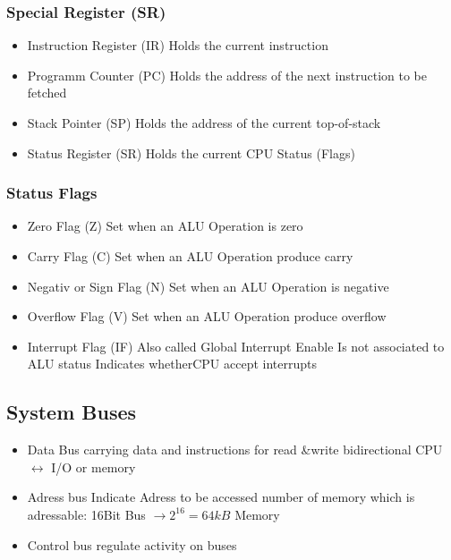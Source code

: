 \begin{multicols}{2}
	\subsubsection{Special Register (\acs{SR})}	
	\begin{itemize}
		\item Instruction Register (\acs{IR})
		\subitem Holds the current instruction 
		\item Programm Counter (\acs{PC})
		\subitem Holds the address of the next instruction to be fetched
		\item Stack Pointer (\acs{SP})
		\subitem Holds the address of the current top-of-stack 
		\item Status Register (\acs{SR})
		\subitem Holds the current \acs{CPU} Status (Flags)
	\end{itemize}
	\subsubsection{Status Flags}
	\begin{itemize}
		\item Zero Flag (Z)
		\subitem Set when an \acs{ALU} Operation is zero
		\item Carry Flag (C)
		\subitem Set when an \acs{ALU} Operation produce carry
		\item Negativ or Sign Flag (N)
		\subitem Set when an \acs{ALU} Operation is negative
		\item Overflow Flag (V)
		\subitem Set when an \acs{ALU} Operation produce overflow
		\item Interrupt Flag (IF)
		\subitem Also called Global Interrupt Enable
		\subitem Is not associated to \acs{ALU} status
		\subitem Indicates whether\acs{CPU} accept interrupts
	\end{itemize}
\end{multicols}
\subsection{System Buses }
	\begin{itemize}
		\item Data Bus
		\subitem carrying data and instructions for read \&write
		\subitem bidirectional \acs{CPU} $\leftrightarrow$ \acs{I/O} or memory
		\item Adress bus
		\subitem Indicate Adress to be accessed
		\subitem number of memory which is adressable: 16Bit Bus $\rightarrow 2^{16}=64kB$ Memory
		\item Control bus
		\subitem regulate activity on buses		
	\end{itemize}
